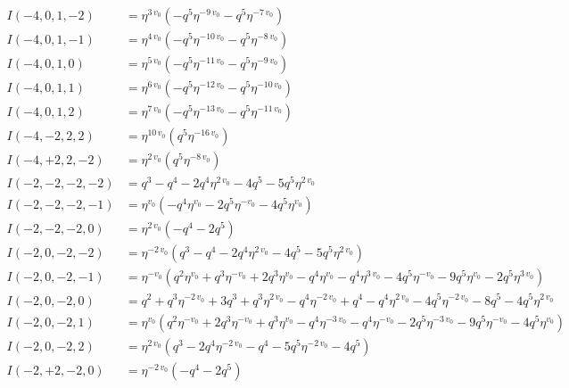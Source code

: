 \documentclass{article}
\begin{document}
\begin{align*}
I(-4, 0, 1, -2) &= \eta^{3 \, v_{0}} \left( -q^{5} \eta^{-9 \, v_{0}} - q^{5} \eta^{-7 \, v_{0}} \right) \\
I(-4, 0, 1, -1) &= \eta^{4 \, v_{0}} \left( -q^{5} \eta^{-10 \, v_{0}} - q^{5} \eta^{-8 \, v_{0}} \right) \\
I(-4, 0, 1, 0) &= \eta^{5 \, v_{0}} \left( -q^{5} \eta^{-11 \, v_{0}} - q^{5} \eta^{-9 \, v_{0}} \right) \\
I(-4, 0, 1, 1) &= \eta^{6 \, v_{0}} \left( -q^{5} \eta^{-12 \, v_{0}} - q^{5} \eta^{-10 \, v_{0}} \right) \\
I(-4, 0, 1, 2) &= \eta^{7 \, v_{0}} \left( -q^{5} \eta^{-13 \, v_{0}} - q^{5} \eta^{-11 \, v_{0}} \right) \\
I(-4, -2, 2, 2) &= \eta^{10 \, v_{0}} \left( q^{5} \eta^{-16 \, v_{0}} \right) \\
I(-4, +2, 2, -2) &= \eta^{2 \, v_{0}} \left( q^{5} \eta^{-8 \, v_{0}} \right) \\
I(-2, -2, -2, -2) &= q^{3} - q^{4} - 2 q^{4} \eta^{2 \, v_{0}} - 4 q^{5} - 5 q^{5} \eta^{2 \, v_{0}} \\
I(-2, -2, -2, -1) &= \eta^{v_{0}} \left( -q^{4} \eta^{v_{0}} - 2 q^{5} \eta^{-v_{0}} - 4 q^{5} \eta^{v_{0}} \right) \\
I(-2, -2, -2, 0) &= \eta^{2 \, v_{0}} \left( -q^{4} - 2 q^{5} \right) \\
I(-2, 0, -2, -2) &= \eta^{-2 \, v_{0}} \left( q^{3} - q^{4} - 2 q^{4} \eta^{2 \, v_{0}} - 4 q^{5} - 5 q^{5} \eta^{2 \, v_{0}} \right) \\
I(-2, 0, -2, -1) &= \eta^{-v_{0}} \left( q^{2} \eta^{v_{0}} + q^{3} \eta^{-v_{0}} + 2 q^{3} \eta^{v_{0}} - q^{4} \eta^{v_{0}} - q^{4} \eta^{3 \, v_{0}} - 4 q^{5} \eta^{-v_{0}} - 9 q^{5} \eta^{v_{0}} - 2 q^{5} \eta^{3 \, v_{0}} \right) \\
I(-2, 0, -2, 0) &= q^{2} + q^{3} \eta^{-2 \, v_{0}} + 3 q^{3} + q^{3} \eta^{2 \, v_{0}} - q^{4} \eta^{-2 \, v_{0}} + q^{4} - q^{4} \eta^{2 \, v_{0}} - 4 q^{5} \eta^{-2 \, v_{0}} - 8 q^{5} - 4 q^{5} \eta^{2 \, v_{0}} \\
I(-2, 0, -2, 1) &= \eta^{v_{0}} \left( q^{2} \eta^{-v_{0}} + 2 q^{3} \eta^{-v_{0}} + q^{3} \eta^{v_{0}} - q^{4} \eta^{-3 \, v_{0}} - q^{4} \eta^{-v_{0}} - 2 q^{5} \eta^{-3 \, v_{0}} - 9 q^{5} \eta^{-v_{0}} - 4 q^{5} \eta^{v_{0}} \right) \\
I(-2, 0, -2, 2) &= \eta^{2 \, v_{0}} \left( q^{3} - 2 q^{4} \eta^{-2 \, v_{0}} - q^{4} - 5 q^{5} \eta^{-2 \, v_{0}} - 4 q^{5} \right) \\
I(-2, +2, -2, 0) &= \eta^{-2 \, v_{0}} \left( -q^{4} - 2 q^{5} \right) \\

\end{align*}
\end{document}
